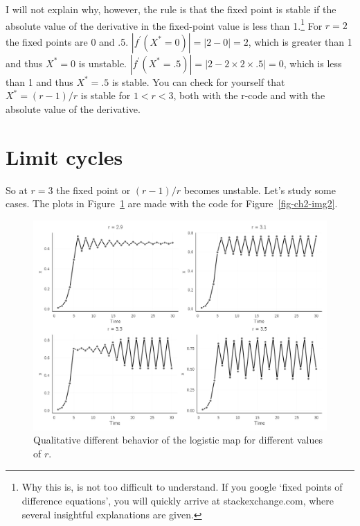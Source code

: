 \documentclass[
  a4paper,
  DIV=11,
  numbers=noendperiod,
  oneside]{scrreprt}
\begin{document}
I will not explain why, however, the rule is that the fixed point is
stable if the absolute value of the derivative in the fixed-point value
is less than 1.\footnote{Why this is, is not too difficult to
  understand. If you google `fixed points of difference equations', you
  will quickly arrive at stackexchange.com, where several insightful
  explanations are given.} For \(r = 2\) the fixed points are 0 and .5.
\(\left| f^{'}\left( X^{*} = 0 \right) \right| = |2 - 0| = 2\), which is
greater than 1 and thus \(X^{*} = 0\) is unstable.
\(\left| f^{'}\left( X^{*} = .5 \right) \right| = |2 - 2 \times 2 \times .5| = 0\),
which is less than 1 and thus \(X^{*} = .5\) is stable. You can check
for yourself that \(X^{*}=(r - 1)/r\) is stable for \(1 < r < 3\), both
with the r-code and with the absolute value of the derivative.

\hypertarget{sec-Limit-cycles}{%
\section{Limit cycles}\label{sec-Limit-cycles}}

So at \(r = 3\) the fixed point or \((r - 1)/r\) becomes unstable. Let's
study some cases. The plots in Figure~\ref{fig-ch2-img4} are made with
the code for Figure~\ref{fig-ch2-img2}.

\begin{figure}

{\centering \includegraphics{media/ch2/fig-ch2-img4.jpg}

}

\caption{\label{fig-ch2-img4}Qualitative different behavior of the
logistic map for different values of \(r\).}

\end{figure}
\end{document}
